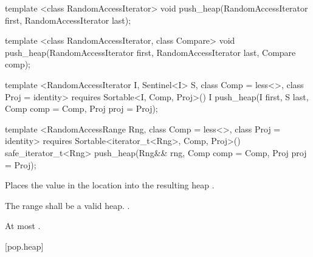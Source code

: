 %
\begin{removedblock}
\begin{itemdecl}
template <class RandomAccessIterator>
  void push_heap(RandomAccessIterator first, RandomAccessIterator last);

template <class RandomAccessIterator, class Compare>
  void push_heap(RandomAccessIterator first, RandomAccessIterator last,
                 Compare comp);
\end{itemdecl}
\end{removedblock}
\begin{addedblock}
\begin{itemdecl}
template <RandomAccessIterator I, Sentinel<I> S, class Comp = less<>,
    class Proj = identity>
  requires Sortable<I, Comp, Proj>()
  I push_heap(I first, S last, Comp comp = Comp{}, Proj proj = Proj{});

template <RandomAccessRange Rng, class Comp = less<>, class Proj = identity>
  requires Sortable<iterator_t<Rng>, Comp, Proj>()
  safe_iterator_t<Rng>
    push_heap(Rng&& rng, Comp comp = Comp{}, Proj proj = Proj{});
\end{itemdecl}
\end{addedblock}

\begin{itemdescr}
\pnum
\effects
Places the value in the location
into the resulting heap
.

\pnum
\requires
The range
shall be a valid heap.
.

\begin{addedblock}
\pnum
\returns {}
\end{addedblock}

\pnum
\complexity
At most
.
\end{itemdescr}

[pop.heap]{}

